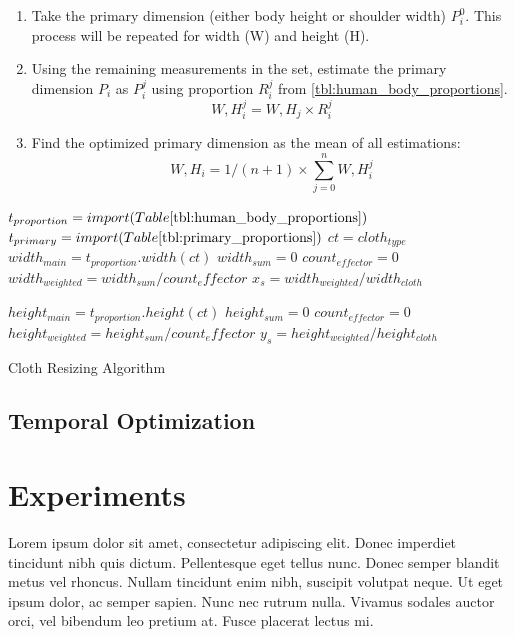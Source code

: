 \documentclass[twocolumn]{svjour3}          %
\begin{document}
\begin{enumerate}
\item Take the primary dimension (either body height or shoulder width) $P_i^0$. This process will be repeated for width (W) and height (H).
\item Using the remaining measurements in the set,  estimate the primary dimension $P_i$ as $P_i^j$ using proportion $R_i^j$ from \ref{tbl:human_body_proportions}.
\begin{equation}
W,H_i^j=W,H_j \times R_i^j
\label{eqn:proportion_estimation}
\end{equation}
\item Find the optimized primary dimension as the mean of all estimations:
\begin{equation}
W,H_i=1/(n+1) \times \sum\limits_{j=0}^n W,H_i^j
\label{eqn:optimized_parameter}
\end{equation}
\end{enumerate}

\begin{algorithm}
\dontprintsemicolon %

$t_{proportion}=import(Table \ref{tbl:human_body_proportions})$ \;
$t_{primary}=import(Table \ref{tbl:primary_proportions})$ \;
$ct=cloth_{type}$\;
$width_{main}=t_{proportion}.width(ct)$\;
$width_{sum}=0$\;
$count_{effector}=0$\;
$width_{weighted}=width_{sum}/count_effector$
$x_s=width_{weighted}/width_{cloth}$\;

$height_{main}=t_{proportion}.height(ct)$\;
$height_{sum}=0$\;
$count_{effector}=0$\;
$height_{weighted}=height_{sum}/count_effector$
$y_s=height_{weighted}/height_{cloth}$\;
\caption{Cloth Resizing Algorithm}
\label{algo:cloth_resize}
\end{algorithm}

\subsection{Temporal Optimization}
\label{subsec:3.3}

\section{Experiments}
\label{sec:4}
Lorem ipsum dolor sit amet, consectetur adipiscing elit. Donec imperdiet tincidunt nibh quis dictum. Pellentesque eget tellus nunc. Donec semper blandit metus vel rhoncus. Nullam tincidunt enim nibh, suscipit volutpat neque. Ut eget ipsum dolor, ac semper sapien. Nunc nec rutrum nulla. Vivamus sodales auctor orci, vel bibendum leo pretium at. Fusce placerat lectus mi.
\end{document}
